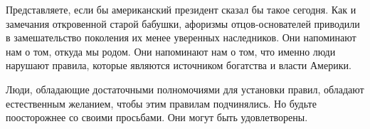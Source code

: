 \documentclass[ebook,12pt,oneside,openany]{memoir}
\begin{document}
Представляете, если бы американский президент сказал бы такое сегодня.
Как и замечания откровенной старой бабушки, афоризмы отцов-основателей
приводили в замешательство поколения их менее уверенных наследников.
Они напоминают нам о том, откуда мы родом. Они напоминают нам о том,
что именно люди нарушают правила, которые являются источником
богатства и власти Америки.

Люди, обладающие достаточными полномочиями для установки правил,
обладают естественным желанием, чтобы этим правилам подчинялись. Но
будьте поосторожнее со своими просьбами. Они могут быть удовлетворены.
\end{document}
